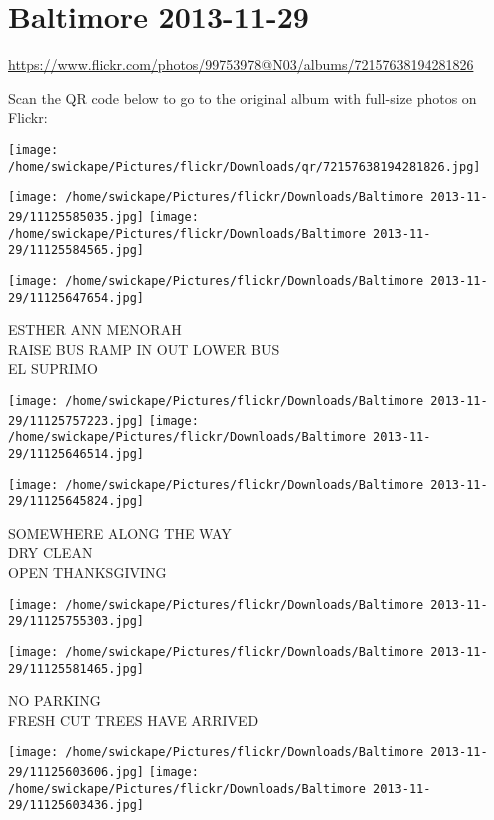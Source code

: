 \documentclass[10pt,letterpaper]{article}
\title{}
\author{}
\date{}
\begin{document}
\section*{Baltimore 2013-11-29}

\url{https://www.flickr.com/photos/99753978@N03/albums/72157638194281826}

Scan the QR code below to go to the original album with full-size photos on Flickr:

\texttt{[image: /home/swickape/Pictures/flickr/Downloads/qr/72157638194281826.jpg]}
\pagebreak

\texttt{[image: /home/swickape/Pictures/flickr/Downloads/Baltimore 2013-11-29/11125585035.jpg]}
\texttt{[image: /home/swickape/Pictures/flickr/Downloads/Baltimore 2013-11-29/11125584565.jpg]}

\vspace{0.25in}
\texttt{[image: /home/swickape/Pictures/flickr/Downloads/Baltimore 2013-11-29/11125647654.jpg]}

ESTHER ANN MENORAH\\
RAISE BUS RAMP IN OUT LOWER BUS\\
EL SUPRIMO
\pagebreak

\texttt{[image: /home/swickape/Pictures/flickr/Downloads/Baltimore 2013-11-29/11125757223.jpg]}
\texttt{[image: /home/swickape/Pictures/flickr/Downloads/Baltimore 2013-11-29/11125646514.jpg]}

\vspace{0.25in}
\texttt{[image: /home/swickape/Pictures/flickr/Downloads/Baltimore 2013-11-29/11125645824.jpg]}

SOMEWHERE ALONG THE WAY\\
DRY CLEAN\\
OPEN THANKSGIVING
\pagebreak

\texttt{[image: /home/swickape/Pictures/flickr/Downloads/Baltimore 2013-11-29/11125755303.jpg]}

\vspace{0.25in}
\texttt{[image: /home/swickape/Pictures/flickr/Downloads/Baltimore 2013-11-29/11125581465.jpg]}

NO PARKING\\
FRESH CUT TREES HAVE ARRIVED
\pagebreak

\texttt{[image: /home/swickape/Pictures/flickr/Downloads/Baltimore 2013-11-29/11125603606.jpg]}
\texttt{[image: /home/swickape/Pictures/flickr/Downloads/Baltimore 2013-11-29/11125603436.jpg]}
\end{document}
